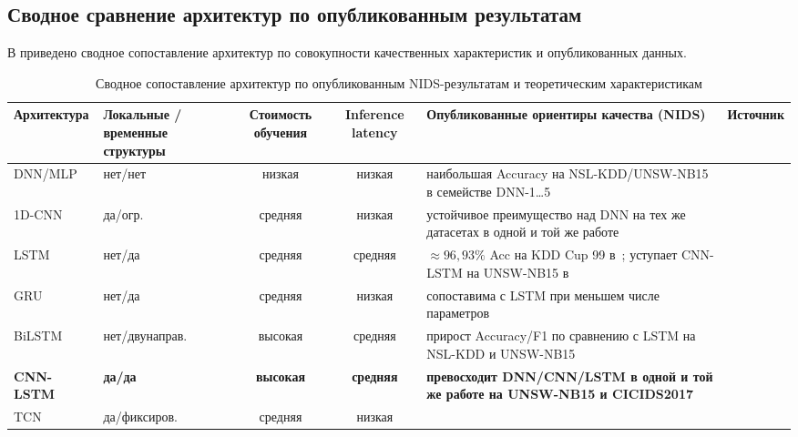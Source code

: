 \subsection{Сводное сравнение архитектур по опубликованным результатам}

В  приведено сводное сопоставление
архитектур по совокупности качественных характеристик и опубликованных
данных.

\begin{table}[H]
\centering
\caption{Сводное сопоставление архитектур по опубликованным
NIDS-результатам и теоретическим характеристикам}
\label{tab:summary-architectures}
\renewcommand{\arraystretch}{1.25}
\setlength{\tabcolsep}{3pt}
\footnotesize
\begin{tabularx}{\linewidth}{@{}lXccXl@{}}
\toprule
\textbf{Архитектура} & \textbf{Локальные / временные структуры} &
\textbf{Стоимость обучения} & \textbf{Inference latency} &
\textbf{Опубликованные ориентиры качества (NIDS)} & \textbf{Источник} \\
\midrule
DNN/MLP & нет/нет        & низкая   & низкая   &
наибольшая Accuracy на NSL-KDD/UNSW-NB15 в семействе DNN-1\dots5 &
\cite{vinayakumar2019dl, sharafaldin2018toward, moustafa2016eval} \\
\addlinespace
1D-CNN  & да/огр.        & средняя  & низкая   &
устойчивое преимущество над DNN на тех же датасетах в одной и той же работе &
\cite{vinayakumar2019dl, ferrag2020dlcyber, liu2019survey} \\
\addlinespace
LSTM    & нет/да         & средняя  & средняя  &
\(\approx 96{,}93\%\) Acc на KDD Cup 99 в~\cite{kim2016lstm}; уступает
CNN-LSTM на UNSW-NB15 в~\cite{vinayakumar2019dl} &
\cite{kim2016lstm, yin2017dlrnn, vinayakumar2019dl} \\
\addlinespace
GRU     & нет/да         & средняя  & низкая   &
сопоставима с LSTM при меньшем числе параметров &
\cite{vinayakumar2019dl, ahmad2021nids} \\
\addlinespace
BiLSTM  & нет/двунаправ. & высокая  & средняя  &
прирост Accuracy/F1 по сравнению с LSTM на NSL-KDD и UNSW-NB15 &
\cite{ahmad2021nids, ferrag2020dlcyber} \\
\addlinespace
\textbf{CNN-LSTM} & \textbf{да/да} & \textbf{высокая} & \textbf{средняя} &
\textbf{превосходит DNN/CNN/LSTM в одной и той же работе на UNSW-NB15 и CICIDS2017} &
\textbf{\cite{vinayakumar2019dl, ferrag2020dlcyber, liu2019survey, ahmad2021nids}} \\
\addlinespace
TCN         & да/фиксиров. & средняя  & низкая   &

\end{tabularx}
\end{table}
